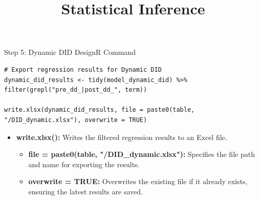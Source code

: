 \documentclass[dvipsnames,hyperref={pdfpagelabels=false}]{beamer}
\begin{document}
\begin{frame}[fragile]{Step 5: Dynamic DID Design}{R Command}
	
\begin{lstlisting}	
# Export regression results for Dynamic DID
dynamic_did_results <- tidy(model_dynamic_did) %>%
filter(grepl("pre_dd_|post_dd_", term))

write.xlsx(dynamic_did_results, file = paste0(table, "/DID_dynamic.xlsx"), overwrite = TRUE)
\end{lstlisting}
	\begin{itemize}
		\item \textbf{write.xlsx():} Writes the filtered regression results to an Excel file.
					\vspace{0.2cm}
		\begin{itemize}
			\item \textbf{file = paste0(table, "/DID\_dynamic.xlsx"):} Specifies the file path and name for exporting the results.
			\vspace{0.2cm}
			\item \textbf{overwrite = TRUE:} Overwrites the existing file if it already exists, ensuring the latest results are saved.
		\end{itemize}
	\end{itemize}
\end{frame}




\title[]  
{Statistical Inference}


\author 
{}

\institute{}






\date
{}


\begin{frame}{}
	\titlepage
\end{frame}
\end{document}
